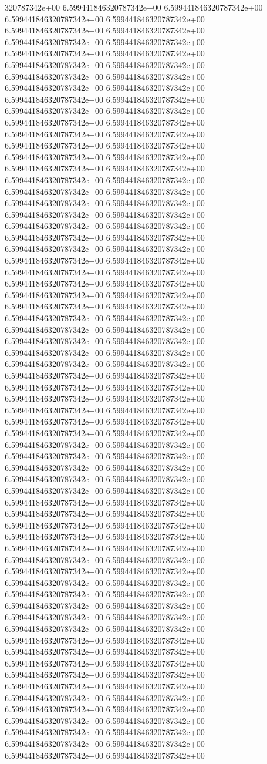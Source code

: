 320787342e+00	6.599441846320787342e+00	6.599441846320787342e+00	6.599441846320787342e+00	6.599441846320787342e+00	6.599441846320787342e+00	6.599441846320787342e+00	6.599441846320787342e+00	6.599441846320787342e+00	6.599441846320787342e+00	6.599441846320787342e+00	6.599441846320787342e+00	6.599441846320787342e+00	6.599441846320787342e+00	6.599441846320787342e+00	6.599441846320787342e+00	6.599441846320787342e+00	6.599441846320787342e+00	6.599441846320787342e+00	6.599441846320787342e+00	6.599441846320787342e+00	6.599441846320787342e+00	6.599441846320787342e+00	6.599441846320787342e+00	6.599441846320787342e+00	6.599441846320787342e+00	6.599441846320787342e+00	6.599441846320787342e+00	6.599441846320787342e+00	6.599441846320787342e+00	6.599441846320787342e+00	6.599441846320787342e+00	6.599441846320787342e+00	6.599441846320787342e+00	6.599441846320787342e+00	6.599441846320787342e+00	6.599441846320787342e+00	6.599441846320787342e+00	6.599441846320787342e+00	6.599441846320787342e+00	6.599441846320787342e+00	6.599441846320787342e+00	6.599441846320787342e+00	6.599441846320787342e+00	6.599441846320787342e+00	6.599441846320787342e+00	6.599441846320787342e+00	6.599441846320787342e+00	6.599441846320787342e+00	6.599441846320787342e+00	6.599441846320787342e+00	6.599441846320787342e+00	6.599441846320787342e+00	6.599441846320787342e+00	6.599441846320787342e+00	6.599441846320787342e+00	6.599441846320787342e+00	6.599441846320787342e+00	6.599441846320787342e+00	6.599441846320787342e+00	6.599441846320787342e+00	6.599441846320787342e+00	6.599441846320787342e+00	6.599441846320787342e+00	6.599441846320787342e+00	6.599441846320787342e+00	6.599441846320787342e+00	6.599441846320787342e+00	6.599441846320787342e+00	6.599441846320787342e+00	6.599441846320787342e+00	6.599441846320787342e+00	6.599441846320787342e+00	6.599441846320787342e+00	6.599441846320787342e+00	6.599441846320787342e+00	6.599441846320787342e+00	6.599441846320787342e+00	6.599441846320787342e+00	6.599441846320787342e+00	6.599441846320787342e+00	6.599441846320787342e+00	6.599441846320787342e+00	6.599441846320787342e+00	6.599441846320787342e+00	6.599441846320787342e+00	6.599441846320787342e+00	6.599441846320787342e+00	6.599441846320787342e+00	6.599441846320787342e+00	6.599441846320787342e+00	6.599441846320787342e+00	6.599441846320787342e+00	6.599441846320787342e+00	6.599441846320787342e+00	6.599441846320787342e+00	6.599441846320787342e+00	6.599441846320787342e+00	6.599441846320787342e+00	6.599441846320787342e+00	6.599441846320787342e+00	6.599441846320787342e+00	6.599441846320787342e+00	6.599441846320787342e+00	6.599441846320787342e+00	6.599441846320787342e+00	6.599441846320787342e+00	6.599441846320787342e+00	6.599441846320787342e+00	6.599441846320787342e+00	6.599441846320787342e+00	6.599441846320787342e+00	6.599441846320787342e+00	6.599441846320787342e+00	6.599441846320787342e+00	6.599441846320787342e+00	6.599441846320787342e+00	6.599441846320787342e+00	6.599441846320787342e+00	6.599441846320787342e+00	6.599441846320787342e+00	6.599441846320787342e+00	6.599441846320787342e+00	6.599441846320787342e+00	6.599441846320787342e+00	6.599441846320787342e+00	6.599441846320787342e+00	6.599441846320787342e+00	6.599441846320787342e+00	6.599441846320787342e+00	6.599441846320787342e+00	6.599441846320787342e+00	6.599441846320787342e+00
